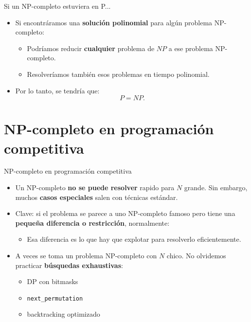 \documentclass[aspectratio=169]{beamer}
\begin{document}
\begin{frame}{Si un NP-completo estuviera en P...}
  \begin{itemize}
    \item Si encontráramos una \textbf{solución polinomial} para algún problema NP-completo:
      \begin{itemize}
        \item Podríamos reducir \textbf{cualquier} problema de $NP$ a ese problema NP-completo.
        \item Resolveríamos también esos problemas en tiempo polinomial.
      \end{itemize}
    \item Por lo tanto, se tendría que:
      \[
        P = NP.
      \]
  \end{itemize}
\end{frame}

\section{NP-completo en programación competitiva}

\begin{frame}{NP-completo en programación competitiva}
  \begin{itemize}
    \item Un NP-completo \textbf{no se puede resolver} rapido para $N$ grande. Sin embargo, muchos \textbf{casos especiales} salen con técnicas estándar.
    \item Clave: si el problema se parece a uno NP-completo famoso pero tiene una \textbf{pequeña diferencia o restricción}, normalmente:
      \begin{itemize}
        \item Esa diferencia es lo que hay que explotar para resolverlo eficientemente.
      \end{itemize}
    \item A veces se toma un problema NP-completo con $N$ chico. No olvidemos practicar \textbf{búsquedas exhaustivas}:
      \begin{itemize}
        \item DP con bitmasks
        \item \texttt{next\_permutation}
        \item backtracking optimizado
      \end{itemize}
  \end{itemize}
\end{frame}
\end{document}
